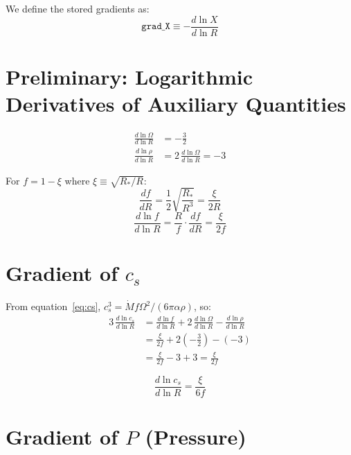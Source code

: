 \documentclass[11pt]{article}
\begin{document}
We define the stored gradients as:
\[
    \texttt{grad\_X} \equiv -\frac{d\ln X}{d\ln R}
\]

\section{Preliminary: Logarithmic Derivatives of Auxiliary Quantities}

\begin{align}
    \frac{d\ln\Omega}{d\ln R} &= -\frac{3}{2} \label{eq:dlnOmega} \\[6pt]
    \frac{d\ln\rho}{d\ln R} &= 2\,\frac{d\ln\Omega}{d\ln R} = -3 \label{eq:dlnrho}
\end{align}

For $f = 1 - \xi$ where $\xi \equiv \sqrt{R_*/R}$:
\begin{equation}
    \frac{df}{dR} = \frac{1}{2}\sqrt{\frac{R_*}{R^3}} = \frac{\xi}{2R}
\end{equation}
\begin{equation}
    \frac{d\ln f}{d\ln R} = \frac{R}{f}\cdot\frac{df}{dR} = \frac{\xi}{2f} \label{eq:dlnf}
\end{equation}

\section{Gradient of $c_s$}

From equation~\eqref{eq:cs}, $c_s^3 = \dot{M} f \Omega^2 / (6\pi\alpha\rho)$, so:
\begin{align}
    3\,\frac{d\ln c_s}{d\ln R}
    &= \frac{d\ln f}{d\ln R} + 2\,\frac{d\ln\Omega}{d\ln R} - \frac{d\ln\rho}{d\ln R} \nonumber\\
    &= \frac{\xi}{2f} + 2\!\left(-\frac{3}{2}\right) - (-3) \nonumber\\
    &= \frac{\xi}{2f} - 3 + 3 = \frac{\xi}{2f}
\end{align}

\begin{equation}
    \boxed{\frac{d\ln c_s}{d\ln R} = \frac{\xi}{6f}}
    \label{eq:dlncs}
\end{equation}

\section{Gradient of $P$ (Pressure)}
\end{document}
